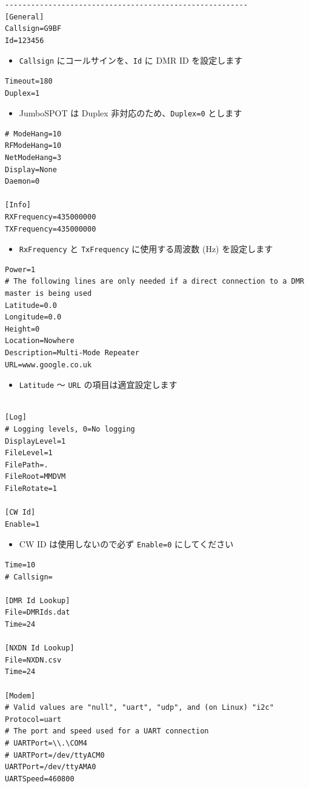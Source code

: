 \documentclass[a4j,oneside]{ujbook}
\begin{document}
\begin{verbatim}
--------------------------------------------------------
[General]
Callsign=G9BF
Id=123456
\end{verbatim}
\begin{itemize}
 \renewcommand{\labelitemi}{$\triangleright$}
 \item \verb+Callsign+ にコールサインを、\verb+Id+ に DMR ID を設定します
\end{itemize}
\begin{verbatim}
Timeout=180
Duplex=1
\end{verbatim}
\begin{itemize}
 \renewcommand{\labelitemi}{$\triangleright$}
 \item JumboSPOT は Duplex 非対応のため、\verb+Duplex=0+ とします
\end{itemize}
\begin{verbatim}
# ModeHang=10
RFModeHang=10
NetModeHang=3
Display=None
Daemon=0

[Info]
RXFrequency=435000000
TXFrequency=435000000
\end{verbatim}
\begin{itemize}
 \renewcommand{\labelitemi}{$\triangleright$}
 \item \verb+RxFrequency+ と \verb+TxFrequency+ に使用する周波数 (Hz) を設定します
\end{itemize}
\begin{verbatim}
Power=1
# The following lines are only needed if a direct connection to a DMR master is being used
Latitude=0.0
Longitude=0.0
Height=0
Location=Nowhere
Description=Multi-Mode Repeater
URL=www.google.co.uk
\end{verbatim}
\begin{itemize}
 \renewcommand{\labelitemi}{$\triangleright$}
 \item \verb+Latitude+ 〜 \verb+URL+ の項目は適宜設定します
\end{itemize}
\begin{verbatim}

[Log]
# Logging levels, 0=No logging
DisplayLevel=1
FileLevel=1
FilePath=.
FileRoot=MMDVM
FileRotate=1

[CW Id]
Enable=1
\end{verbatim}
\begin{itemize}
 \renewcommand{\labelitemi}{$\triangleright$}
 \item CW ID は使用しないので必ず \verb+Enable=0+ にしてください
\end{itemize}
\begin{verbatim}
Time=10
# Callsign=

[DMR Id Lookup]
File=DMRIds.dat
Time=24

[NXDN Id Lookup]
File=NXDN.csv
Time=24

[Modem]
# Valid values are "null", "uart", "udp", and (on Linux) "i2c"
Protocol=uart
# The port and speed used for a UART connection
# UARTPort=\\.\COM4
# UARTPort=/dev/ttyACM0
UARTPort=/dev/ttyAMA0
UARTSpeed=460800
\end{verbatim}
\end{document}
